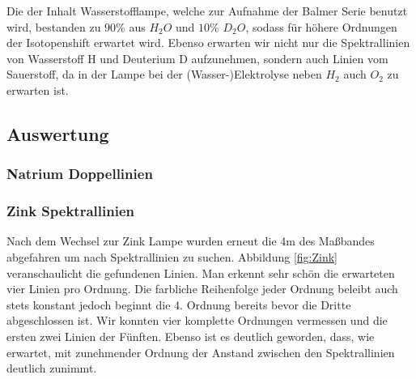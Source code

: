 \documentclass[]{article}
\begin{document}

Die der Inhalt Wasserstofflampe, welche zur Aufnahme der Balmer Serie benutzt wird, bestanden zu $90\%$ aus $H_2O$ und $10\%$ $D_2O$, sodass für höhere Ordnungen der Isotopenshift erwartet wird. Ebenso erwarten wir nicht nur die Spektrallinien von Wasserstoff H und Deuterium D aufzunehmen, sondern auch Linien vom Sauerstoff, da in der Lampe bei der (Wasser-)Elektrolyse neben $H_2$ auch $O_2$ zu erwarten ist.


\subsection{Auswertung}
\subsubsection{Natrium Doppellinien}

\subsubsection{Zink Spektrallinien}
Nach dem Wechsel zur Zink Lampe wurden erneut die 4m des Maßbandes abgefahren um nach Spektrallinien zu suchen. Abbildung \ref{fig:Zink} veranschaulicht die gefundenen Linien. Man erkennt sehr schön die erwarteten vier Linien pro Ordnung. Die farbliche Reihenfolge jeder Ordnung beleibt auch stets konstant jedoch beginnt die 4. Ordnung bereits bevor die Dritte abgeschlossen ist. Wir konnten vier komplette Ordnungen vermessen und die ersten zwei Linien der Fünften. Ebenso ist es deutlich geworden, dass, wie erwartet, mit zunehmender Ordnung der Anstand zwischen den Spektrallinien deutlich zunimmt. 


\end{document}
